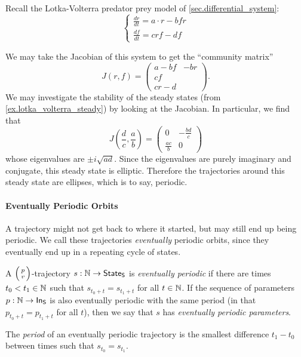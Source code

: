 \documentclass[DynamicalBook]{subfiles}
\begin{document}
\begin{example}\label{ex.lotka_volterra_orbit}
  Recall the Lotka-Volterra predator prey model of \cref{sec.differential_system}:
  \[
  \begin{cases}
    
\frac{dr}{dt} =  a
\cdot r - b f r \\
\frac{df}{dt} = c r f - d f
  \end{cases}
  \]

  We may take the Jacobian of this system to get the ``community matrix''
  \[
J(r, f) = \begin{pmatrix} a - bf & -br \\ cf \\ cr - d  \end{pmatrix}.
  \]
We may investigate the stability of the steady states (from \cref{ex.lotka_volterra_steady}) by looking at the Jacobian.
In particular, we find that
\[
J\left( \frac{d}{c}, \frac{a}{b} \right) = \begin{pmatrix}0 & -\frac{bd}{c}\\ \frac{ac}{b}& 0 \end{pmatrix}
\]
whose eigenvalues are $\pm i \sqrt{ad}$. Since the eigenvalues are purely
imaginary and conjugate, this steady state is elliptic. Therefore the
trajectories around this steady state are ellipses, which is to say, periodic. 
 
\end{example}

\paragraph{Eventually Periodic Orbits}
A trajectory might not get back to where it started, but may still end up being
periodic. We call these trajectories \emph{eventually} periodic orbits, since
they eventually end up in a repeating cycle of states.

\begin{definition} \label{def.eventually_periodic_orbit_discrete}
A $\lens{p}{v}$-trajectory $s : \mathbb{N} \to
  \mathsf{State}_{\mathsf{S}}$ is \emph{eventually periodic} if there are times $t_0 < t_1 \in
  \mathbb{N}$ such that $s_{t_0 + t} = s_{t_1 + t}$ for all $t \in \mathbb{N}$. If the sequence of
  parameters $p : \mathbb{N} \to \mathsf{In}_{\mathsf{S}}$ is also eventually periodic with the same
  period (in that $p_{t_0 + t} = p_{t_1 + t}$ for all $t$), then we say that $s$ has \emph{eventually periodic parameters}.

The \emph{period} of an eventually periodic trajectory is
  the smallest difference $t_1 - t_0$ between times such that $s_{t_0} = s_{t_1}$.
\end{definition}
\end{document}
